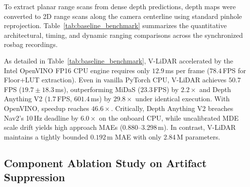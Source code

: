 \documentclass{ieeeaccess}
\begin{document}
To extract planar range scans from dense depth predictions, depth maps were converted to 2D range scans along the camera centerline using standard pinhole reprojection. Table~\ref{tab:baseline_benchmark} summarizes the quantitative architectural, timing, and dynamic ranging comparisons across the synchronized rosbag recordings.

\begin{table}[!t]
  \centering
  \footnotesize
  \caption{Quantitative Benchmark: Proposed V-LiDAR vs. Monocular Depth Estimation (MDE) Baselines on Onboard CPU (Intel Core Ultra 7 155H)}
  \label{tab:baseline_benchmark}
\end{table}

As detailed in Table~\ref{tab:baseline_benchmark}, V-LiDAR accelerated by the Intel OpenVINO FP16 CPU engine requires only $12.9$\,ms per frame ($78.4$\,FPS for Floor+LUT extraction). Even in vanilla PyTorch CPU, V-LiDAR achieves $50.7$\,FPS ($19.7 \pm 18.3$\,ms), outperforming MiDaS ($23.3$\,FPS) by $2.2\times$ and Depth Anything V2 ($1.7$\,FPS, $601.4$\,ms) by $29.8\times$ under identical execution. With OpenVINO, speedup reaches $46.6\times$. Critically, Depth Anything V2 breaches Nav2's 10\,Hz deadline by $6.0\times$ on the onboard CPU, while uncalibrated MDE scale drift yields high approach MAEs ($0.880\text{--}3.298$\,m). In contrast, V-LiDAR maintains a tightly bounded $0.192$\,m MAE with only 2.84\,M parameters.

\subsection{Component Ablation Study on Artifact Suppression}
\label{subsec:ablation_study}
\end{document}
